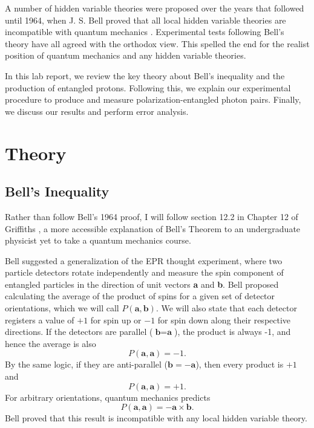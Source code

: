 \documentclass[11pt,letterpaper]{article}
\begin{document}
A number of hidden variable theories were proposed over the years that followed until 1964, when J. S. Bell proved that all local hidden variable theories are incompatible with quantum mechanics \cite{Griffiths}. Experimental tests following Bell's theory have all agreed with the orthodox view. This spelled the end for the realist position of quantum mechanics and any hidden variable theories.

In this lab report, we review the key theory about Bell's inequality and the production of entangled protons. Following this, we explain our experimental procedure to produce and measure polarization-entangled photon pairs. Finally, we discuss our results and perform error analysis.

\section{Theory}

\subsection{Bell's Inequality} \label{Bells ineq}

Rather than follow Bell's 1964 proof, I will follow section 12.2 in Chapter 12 of Griffiths \cite{Griffiths}, a more accessible explanation of Bell's Theorem to an undergraduate physicist yet to take a quantum mechanics course. 

Bell suggested a generalization of the EPR thought experiment, where two particle detectors rotate independently and measure the spin component of entangled particles in the direction of unit vectors \textbf{a} and \textbf{b}. Bell proposed calculating the average of the product of spins for a given set of detector orientations, which we will call $P(\textbf{a}, \textbf{b})$. We will also state that each detector registers a value of $+1$ for spin up or $-1$ for spin down along their respective directions. If the detectors are parallel ($\textbf{b} = \textbf{a}$), the product is always -1, and hence the average is also
\begin{equation}
    P(\textbf{a}, \textbf{a}) = -1 .
\end{equation}
By the same logic, if they are anti-parallel ($\textbf{b} = -\textbf{a}$), then every product is $+1$ and
\begin{equation}
    P(\textbf{a}, \textbf{a}) = +1 .
\end{equation}
For arbitrary orientations, quantum mechanics predicts
\begin{equation}
    P(\textbf{a}, \textbf{a}) = -\textbf{a} \times \textbf{b} .
\end{equation}
Bell proved that this result is incompatible with any local hidden variable theory.
\end{document}
